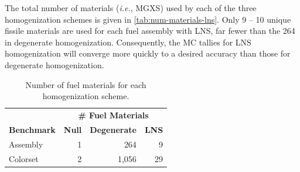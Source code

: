 The total number of materials (\textit{i.e.}, MGXS) used by each of the three homogenization schemes is given in \autoref{tab:num-materials-lns}. Only 9 -- 10 unique fissile materials are used for each fuel assembly with LNS, far fewer than the 264 in degenerate homogenization. Consequently, the MC tallies for LNS homogenization will converge more quickly to a desired accuracy than those for degenerate homogenization. 

\begin{table}[h!]
  \centering
  \caption{Number of fuel materials for each homogenization scheme.}
  \small
  \label{tab:num-materials-lns}
  \vspace{6pt}
  \begin{tabular}{l r r r}
  \toprule
  & \multicolumn{3}{c}{\bf \# Fuel Materials} \\
  \cline{2-4}
  \multirow{-2}{*}{\bf Benchmark} & \textbf{Null} & \textbf{Degenerate} & \textbf{LNS} \\
  \midrule
Assembly & 1 & 264 & 9 \\
Colorset & 2 & 1,056 & 29 \\
  \bottomrule
\end{tabular}
\end{table}

